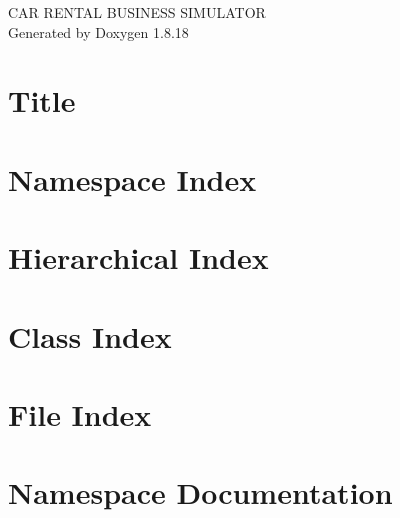 \let\mypdfximage\pdfximage\def\pdfximage{\immediate\mypdfximage}\documentclass[twoside]{book}
\newcommand{\+}{\discretionary{\mbox{\scriptsize$\hookleftarrow$}}{}{}}
\newcommand{\clearemptydoublepage}{%
  \newpage{\pagestyle{empty}\cleardoublepage}%
}
\begin{document}
\hypersetup{pageanchor=false,
             bookmarksnumbered=true,
             pdfencoding=unicode
            }
\begin{titlepage}
\vspace*{7cm}
\begin{center}%
{\Large C\+AR R\+E\+N\+T\+AL B\+U\+S\+I\+N\+E\+SS S\+I\+M\+U\+L\+A\+T\+OR }\\
\vspace*{1cm}
{\large Generated by Doxygen 1.8.18}\\
\end{center}
\end{titlepage}
\clearemptydoublepage
{}
\tableofcontents
\clearemptydoublepage
{}
\hypersetup{pageanchor=true}

\chapter{Title}
\label{index}\hypertarget{index}{}
\chapter{Namespace Index}

\chapter{Hierarchical Index}

\chapter{Class Index}

\chapter{File Index}

\chapter{Namespace Documentation}









\end{document}
